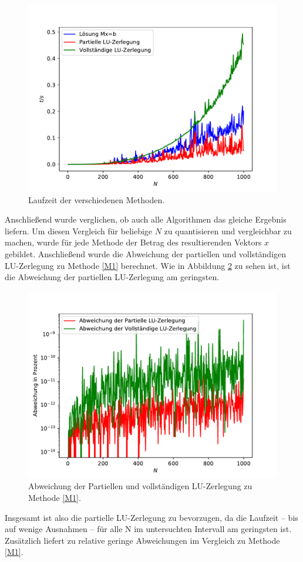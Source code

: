 \documentclass{scrartcl}
\begin{document}
        \begin{figure}[H]
            \centering
            \includegraphics[scale=0.7]{A3/build/timers.pdf}
            \caption{Laufzeit der verschiedenen Methoden.}
            \label{fig:A3times}
        \end{figure}

        Anschließend wurde verglichen, ob auch alle Algorithmen das gleiche Ergebnis liefern. Um diesen Vergleich für beliebige $N$ zu quantisieren und vergleichbar zu machen, wurde für jede Methode der Betrag des resultierenden Vektors $x$ gebildet. Anschließend wurde die Abweichung der partiellen und vollständigen LU-Zerlegung zu Methode \ref{M1}  berechnet. Wie in Abbildung \ref{fig:A3devs} zu sehen ist, ist die Abweichung der partiellen LU-Zerlegung am geringsten. 

        \begin{figure}[H]
            \centering
            \includegraphics[scale=0.7]{A3/build/devs.pdf}
            \caption{Abweichung der Partiellen und vollständigen LU-Zerlegung zu Methode \ref{M1}.}
            \label{fig:A3devs}
        \end{figure}

        Insgesamt ist also die partielle LU-Zerlegung zu bevorzugen, da die Laufzeit  – bis auf wenige Ausnahmen  – für alle N im untersuchten Intervall am geringsten ist. Zusätzlich liefert zu relative geringe Abweichungen im Vergleich zu Methode \ref{M1}.
\end{document}
